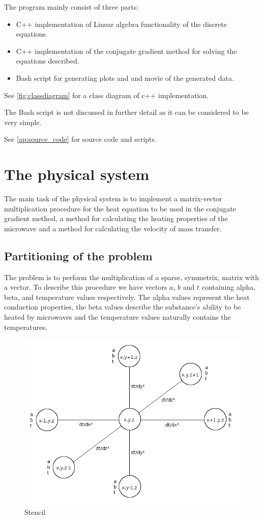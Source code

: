 The program mainly consist of three parts:

\begin{itemize}
\item C++ implementation of Linear algebra functionality of the discrete equations.
\item C++ implementation of the conjugate gradient method for solving the
equations described.
\item Bash script for generating plots and and movie of the generated data.
\end{itemize}

See \cref{fig:classdiagram} for a class diagram of c++ implementation.

The Bash script is not discussed in further detail as it can be considered to be
very simple.

See \cref{ap:source_code} for source code and scripts.

\section{The physical system}

The main task of the physical system is to implement a matrix-vector multiplication
procedure for the heat equation to be used in the conjugate gradient method, 
a method for calculating the heating properties of the microwave and a method 
for calculating the velocity of mass transfer.

\subsection{Partitioning of the problem}

The problem is to perform the multiplication of a sparse, symmetrix, matrix with a
vector. To describe this procedure we have vectors $a$, $b$ and $t$ containing alpha,
beta, and temperature values respectively. The alpha values represent the heat 
conduction properties, the beta values describe the substance's ability to be heated
by microwaves and the temperature values naturally contains the temperatures.

\begin{figure}[!h]
  \begin{center}
    \includegraphics[width=0.5\linewidth]{stencil.png}
  \end{center}
  \caption{Stencil}
  \label{fig:stencil}
\end{figure}

